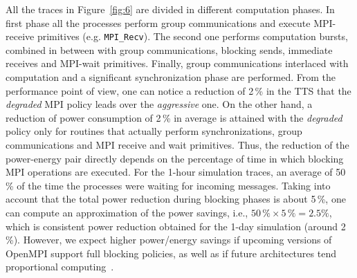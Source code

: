 All  the  traces  in   Figure~\ref{fig:6}  are  divided  in  different
computation  phases. In first  phase all  the processes  perform group
communications      and       execute      MPI-receive      primitives
(e.g. \texttt{MPI\_Recv}). The second one performs computation bursts,
combined  in  between   with  group  communications,  blocking  sends,
immediate  receives and  MPI-wait primitives.  Finally,
group  communications interlaced  with computation  and  a significant
synchronization  phase are  performed. From  the performance  point of
view, one can notice a reduction of 2\,\% in the TTS that the \emph{degraded}  MPI
policy leads over the \emph{aggressive} one. On the other hand, a
reduction of power consumption of  2\,\% in average is attained with the \emph{degraded} 
policy only for routines that actually  perform synchronizations,
group  communications  and MPI receive and wait primitives.   Thus,  the
reduction of the power-energy  pair directly depends on the percentage
of time in which blocking MPI  operations are executed. For the 1-hour
simulation traces, an average of 50\,\% of the time the processes were
waiting for incoming messages.  Taking  into account that  the total power  reduction during
blocking phases  is about 5\,\%,  one can compute an  approximation of
the  power savings,  i.e., $50\,\%  \times  5\,\% =  2.5\%$, which  is
consistent  power  reduction  obtained  for  the  1-day  simulation
(around  2\,\%). However,  we  expect higher  power/energy savings  if
upcoming versions of OpenMPI support full blocking policies, as well as if 
future architectures tend proportional computing~\citep{Barroso-2007}.



